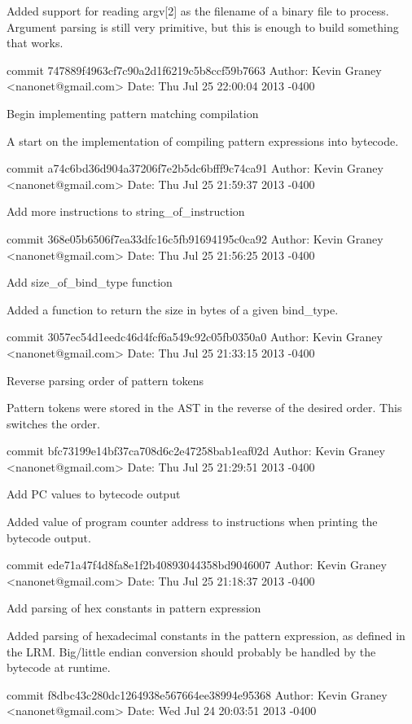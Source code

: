     Added support for reading argv[2] as the filename of a binary file
    to process.  Argument parsing is still very primitive, but this
    is enough to build something that works.

commit 747889f4963cf7c90a2d1f6219c5b8ccf59b7663
Author: Kevin Graney <nanonet@gmail.com>
Date:   Thu Jul 25 22:00:04 2013 -0400

    Begin implementing pattern matching compilation
    
    A start on the implementation of compiling pattern expressions into
    bytecode.

commit a74c6bd36d904a37206f7e2b5dc6bfff9c74ca91
Author: Kevin Graney <nanonet@gmail.com>
Date:   Thu Jul 25 21:59:37 2013 -0400

    Add more instructions to string_of_instruction

commit 368e05b6506f7ea33dfc16c5fb91694195c0ca92
Author: Kevin Graney <nanonet@gmail.com>
Date:   Thu Jul 25 21:56:25 2013 -0400

    Add size_of_bind_type function
    
    Added a function to return the size in bytes of a given bind_type.

commit 3057ec54d1eedc46d4fcf6a549c92c05fb0350a0
Author: Kevin Graney <nanonet@gmail.com>
Date:   Thu Jul 25 21:33:15 2013 -0400

    Reverse parsing order of pattern tokens
    
    Pattern tokens were stored in the AST in the reverse of the desired
    order.  This switches the order.

commit bfc73199e14bf37ca708d6c2e47258bab1eaf02d
Author: Kevin Graney <nanonet@gmail.com>
Date:   Thu Jul 25 21:29:51 2013 -0400

    Add PC values to bytecode output
    
    Added value of program counter address to instructions when printing
    the bytecode output.

commit ede71a47f4d8fa8e1f2b40893044358bd9046007
Author: Kevin Graney <nanonet@gmail.com>
Date:   Thu Jul 25 21:18:37 2013 -0400

    Add parsing of hex constants in pattern expression
    
    Added parsing of hexadecimal constants in the pattern expression,
    as defined in the LRM.  Big/little endian conversion should
    probably be handled by the bytecode at runtime.

commit f8dbc43c280dc1264938e567664ee38994e95368
Author: Kevin Graney <nanonet@gmail.com>
Date:   Wed Jul 24 20:03:51 2013 -0400


